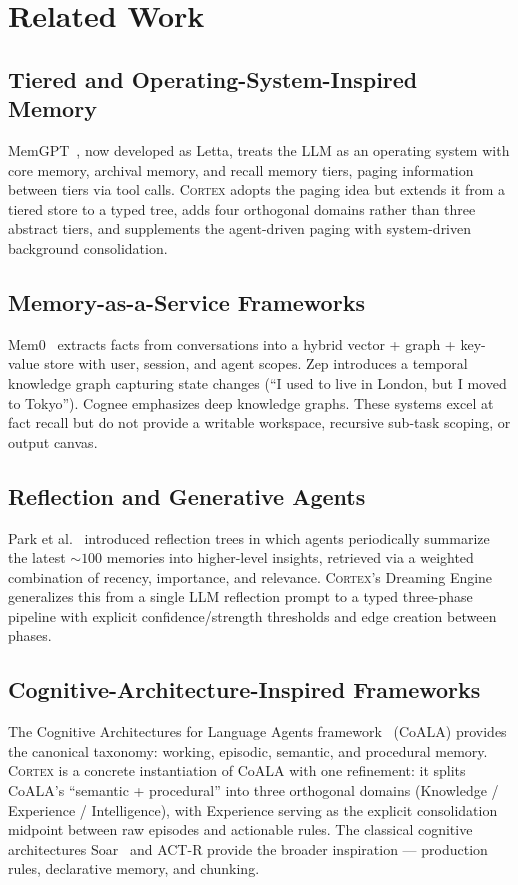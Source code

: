 \documentclass[11pt,a4paper]{article}
\theoremstyle{cortexprop}
\begin{document}
\section{Related Work}
\label{sec:related}

\subsection{Tiered and Operating-System-Inspired Memory}
MemGPT~\cite{packer2023memgpt}, now developed as Letta, treats the LLM as an
operating system with core memory, archival memory, and recall memory tiers,
paging information between tiers via tool calls. \textsc{Cortex} adopts the
paging idea but extends it from a tiered store to a typed tree, adds four
orthogonal domains rather than three abstract tiers, and supplements the
agent-driven paging with system-driven background consolidation.

\subsection{Memory-as-a-Service Frameworks}
Mem0~\cite{bansal2025mem0} extracts facts from conversations into a hybrid
vector + graph + key-value store with user, session, and agent scopes.
Zep introduces a temporal knowledge graph capturing state changes (``I used
to live in London, but I moved to Tokyo''). Cognee emphasizes deep knowledge
graphs. These systems excel at fact recall but do not provide a writable
workspace, recursive sub-task scoping, or output canvas.

\subsection{Reflection and Generative Agents}
Park et al.~\cite{park2023generative} introduced reflection trees in which
agents periodically summarize the latest ${\sim}100$ memories into
higher-level insights, retrieved via a weighted combination of recency,
importance, and relevance. \textsc{Cortex}'s Dreaming Engine generalizes
this from a single LLM reflection prompt to a typed three-phase pipeline
with explicit confidence/strength thresholds and edge creation between
phases.

\subsection{Cognitive-Architecture-Inspired Frameworks}
The Cognitive Architectures for Language Agents
framework~\cite{sumers2023coala} (CoALA) provides the canonical taxonomy:
working, episodic, semantic, and procedural memory. \textsc{Cortex} is a
concrete instantiation of CoALA with one refinement: it splits CoALA's
``semantic + procedural'' into three orthogonal domains (Knowledge /
Experience / Intelligence), with Experience serving as the explicit
consolidation midpoint between raw episodes and actionable rules. The
classical cognitive architectures Soar~\cite{laird2022soar} and ACT-R
provide the broader inspiration --- production rules, declarative memory,
and chunking.
\end{document}
